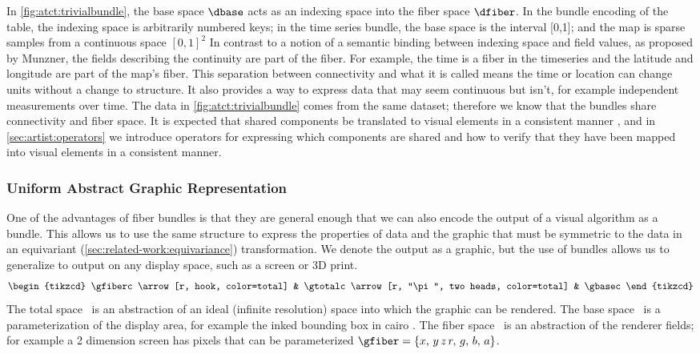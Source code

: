 \documentclass[10pt,journal,compsoc]{IEEEtran}
\theoremstyle{definition}
\theoremstyle{remark}
\begin{document}
In \autoref{fig:atct:trivialbundle}, the base space $\dbase$ acts as an indexing space into the fiber space $\dfiber$. In the bundle encoding of the table, the indexing space is arbitrarily numbered keys; in the time series bundle, the base space is the interval [0,1]; and the map is sparse samples from a continuous space $[0,1]^{2}$ In contrast to a notion of a semantic binding between indexing space and field values, as proposed by Munzner\cite{munznerVisualizationAnalysisDesign2014}, the fields describing the continuity are part of the fiber. For example, the time is a fiber in the timeseries and the latitude and longitude are part of the map's fiber. This separation between connectivity and what it is called means the time or location can change units without a change to structure. It also provides a way to express data that may seem continuous but isn't, for example independent measurements over time. The data in \autoref{fig:atct:trivialbundle} comes from the same dataset; therefore we know that the bundles share connectivity and fiber space. It is expected that shared components be translated to visual elements in a consistent manner \cite{hullmanKeeping2018}, and in \autoref{sec:artist:operators} we introduce operators for expressing which components are shared and how to verify that they have been mapped into visual elements in a consistent manner. 

\subsubsection{Uniform Abstract Graphic Representation}
One of the advantages of fiber bundles is that they are general enough that we can also encode the output of a visual algorithm as a bundle. This allows us to use the same structure to express the properties of data and the graphic that must be symmetric to the data in an equivariant (\autoref{sec:related-work:equivariance}) transformation. We denote the output as a graphic, but the use of bundles allows us to generalize to output on any display space, such as a screen or 3D print. 
\begin{equation}
  \label{eq:atct:fb:graphic}
  \begin{tikzcd}
      \gfiberc \arrow[r, hook, color=total] & \gtotalc \arrow[r, "\pi", two heads, color=total] & \gbasec
  \end{tikzcd}
\end{equation}
The total space \gtotalc\ is an abstraction of an ideal (infinite resolution) space into which the graphic can be rendered. The base space \gbasec\ is a parameterization of the display area, for example the inked bounding box in cairo \cite{CairographicsOrg}. The fiber space \gfiberc\ is an abstraction of the renderer fields; for example a 2 dimension screen has pixels that can be parameterized $ \gfiber=\{x,\,y\,z\,r,\,g,\,b,\,a\}$. 
\end{document}
